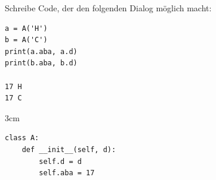 \question[3]
Schreibe Code, der den folgenden Dialog möglich macht:

\begin{lstlisting}
a = A('H')
b = A('C')
print(a.aba, a.d)
print(b.aba, b.d)

17 H
17 C
\end{lstlisting}
\begin{solutionbox}{3cm}
\begin{lstlisting}
class A:
    def __init__(self, d):
        self.d = d
        self.aba = 17
\end{lstlisting}
\end{solutionbox}
